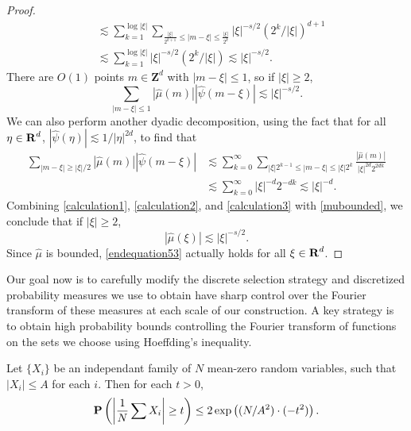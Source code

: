 \begin{proof}
\begin{equation}
\begin{split}
        &\lesssim \sum_{k = 1}^{\log |\xi|} \sum_{\frac{|\xi|}{2^{k+1}} \leq |m - \xi| \leq \frac{|\xi|}{2^{k}}} |\xi|^{-s/2} \left( 2^k/|\xi| \right)^{d+1}\\
        &\lesssim \sum_{k = 1}^{\log |\xi|} |\xi|^{-s/2} (2^k / |\xi| ) \lesssim |\xi|^{-s/2}.
    \end{split}
    \end{equation}
    There are $O(1)$ points $m \in \mathbf{Z}^d$ with $|m - \xi| \leq 1$, so if $|\xi| \geq 2$,
    \begin{equation} \label{calculation2}
        \sum_{|m - \xi| \leq 1} |\widehat{\mu}(m)| |\widehat{\psi}(m - \xi)| \lesssim |\xi|^{-s/2}.
    \end{equation}
    We can also perform another dyadic decomposition, using the fact that for all $\eta \in \operatorname{\mathbf{R}}^d$, $|\widehat{\psi}(\eta)| \lesssim 1/|\eta|^{2d}$, to find that
    \begin{equation} \label{calculation3}
    \begin{split}
        \sum_{|m - \xi| \geq |\xi|/2} |\widehat{\mu}(m)| |\widehat{\psi}(m - \xi)| &\lesssim \sum_{k = 0}^\infty \sum_{|\xi| 2^{k-1} \leq |m - \xi| \leq |\xi| 2^k} \frac{|\widehat{\mu}(m)|}{|\xi|^{2d} 2^{2dk}}\\
        &\lesssim \sum_{k = 0}^\infty |\xi|^{-d} 2^{-dk} \lesssim |\xi|^{-d}.
    \end{split}
    \end{equation}
    Combining \eqref{calculation1}, \eqref{calculation2}, and \eqref{calculation3} with \eqref{mubounded}, we conclude that if $|\xi| \geq 2$,
    \begin{equation} \label{endequation53}
        |\widehat{\mu}(\xi)| \lesssim |\xi|^{-s/2}.
    \end{equation}
    Since $\widehat{\mu}$ is bounded, \eqref{endequation53} actually holds for all $\xi \in \operatorname{\mathbf{R}}^d$.
\end{proof}

Our goal now is to carefully modify the discrete selection strategy and discretized probability measures we use to obtain have sharp control over the Fourier transform of these measures at each scale of our construction. A key strategy is to obtain high probability bounds controlling the Fourier transform of functions on the sets we choose using Hoeffding's inequality.

\begin{theorem}
    Let $\{ X_i \}$ be an independant family of $N$ mean-zero random variables, such that $|X_i| \leq A$ for each $i$. Then for each $t > 0$,
    \[ \operatorname{\mathbf{P}} \left( \left| \frac{1}{N} \sum X_i \right| \geq t \right) \leq 2 \exp \left( (N/A^2) \cdot (- t^2) \right). \]
\end{theorem}

